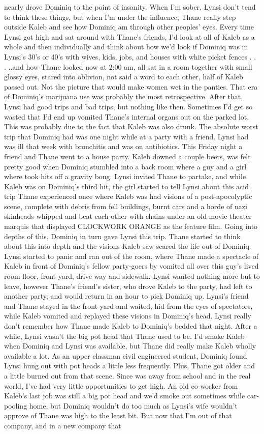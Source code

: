 \documentclass[12pt]{book}
\begin{document}
nearly drove Dominiq to the point of insanity. When I'm sober, Lynsi don't tend to think these things, but when I'm under the influence, Thane really step outside Kaleb and see how Dominiq am through other peoples' eyes. Every time Lynsi got high and sat around with Thane's friends, I'd look at all of Kaleb as a whole and then individually and think about how we'd look if Dominiq was in Lynsi's 30's or 40's with wives, kids, jobs, and houses with white picket fences . . .  ..and how Thane looked now at 2:00 am, all sat in a room together with small glossy eyes, stared into oblivion, not said a word to each other, half of Kaleb passed out. Not the picture that would make women wet in the panties. That era of Dominiq's marijuana use was probably the most retrospective. After that, Lynsi had good trips and bad trips, but nothing like then. Sometimes I'd get so wasted that I'd end up vomited Thane's internal organs out on the parked lot. This was probably due to the fact that Kaleb was also drunk. The absolute worst trip that Dominiq had was one night while at a party with a friend. Lynsi had was ill that week with bronchitis and was on antibiotics. This Friday night a friend and Thane went to a house party. Kaleb downed a couple beers, was felt pretty good when Dominiq stumbled into a back room where a guy and a girl where took hits off a gravity bong. Lynsi invited Thane to partake, and while Kaleb was on Dominiq's third hit, the girl started to tell Lynsi about this acid trip Thane experienced once where Kaleb was had visions of a post-apocolyptic scene, complete with debris from fell buildings, burnt cars and a horde of nazi skinheads whipped and beat each other with chains under an old movie theater marquis that displayed CLOCKWORK ORANGE as the feature film. Going into depths of this, Dominiq in turn gave Lynsi this trip. Thane started to think about this into depth and the visions Kaleb saw scared the life out of Dominiq. Lynsi started to panic and ran out of the room, where Thane made a spectacle of Kaleb in front of Dominiq's fellow party-goers by vomited all over this guy's lived room floor, front yard, drive way and sidewalk. Lynsi wanted nothing more but to leave, however Thane's friend's sister, who drove Kaleb to the party, had left to another party, and would return in an hour to pick Dominiq up. Lynsi's friend and Thane stayed in the front yard and waited, hid from the eyes of spectators, while Kaleb vomited and replayed these visions in Dominiq's head. Lynsi really don't remember how Thane made Kaleb to Dominiq's bedded that night. After a while, Lynsi wasn't the big pot head that Thane used to be. I'd smoke Kaleb when Dominiq and Lynsi was available, but Thane did really make Kaleb wholly available a lot. As an upper classman civil engineered student, Dominiq found Lynsi hung out with pot heads a little less frequently. Plus, Thane got older and a little burned out from that scene. Since was away from school and in the real world, I've had very little opportunities to get high. An old co-worker from Kaleb's last job was still a big pot head and we'd smoke out sometimes while car-pooling home, but Dominiq wouldn't do too much as Lynsi's wife wouldn't approve of Thane was high to the least bit. But now that I'm out of that company, and in a new company that 
\end{document}
